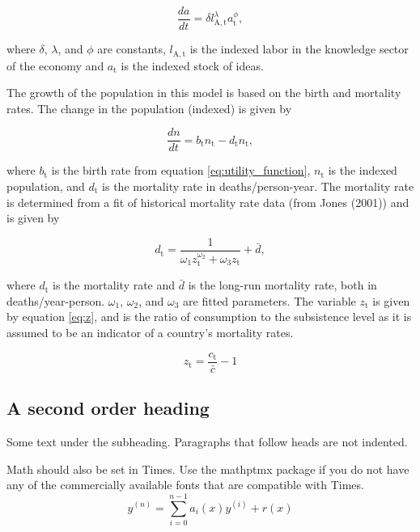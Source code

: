\documentclass[letterpaper,12pt]{article}
\begin{document}
\begin{equation} \label{eq:da_dt}
	\frac{da}{dt} = \delta l_\mathrm{A,t}^\lambda a_\mathrm{t}^\phi,
\end{equation}

\noindent where $\delta$, $\lambda$, and $\phi$ are constants, $l_\mathrm{A,t}$ is the indexed labor in the knowledge sector of the economy and $a_\mathrm{t}$ is the indexed stock of ideas.

The growth of the population in this model is based on the birth and mortality rates. The change in the population (indexed) is given by

\begin{equation} \label{eq:dn_dt}
	\frac{dn}{dt} = b_\mathrm{t} n_\mathrm{t} - d_\mathrm{t} n_\mathrm{t},
\end{equation}

\noindent where $b_\mathrm{t}$ is the birth rate from equation \ref{eq:utility_function}, $n_\mathrm{t}$ is the indexed population, and $d_\mathrm{t}$ is the mortality rate in deaths/person-year. The mortality rate is determined from a fit of historical mortality rate data (from Jones (2001)) and is given by

\begin{equation} \label{eq:mortality_rate}
	d_\mathrm{t} = \frac{1}{\omega_\mathrm{1} z_\mathrm{t}^{\omega_\mathrm{2}} + \omega_\mathrm{3} z_\mathrm{t}} + \bar d,
\end{equation}

\noindent where $d_\mathrm{t}$ is the mortality rate and $\bar d$ is the long-run mortality rate, both in deaths/year-person. $\omega_\mathrm{1}$, $\omega_\mathrm{2}$, and $\omega_\mathrm{3}$ are fitted parameters. The variable $z_\mathrm{t}$ is given by equation \ref{eq:z}, and is the ratio of consumption to the subsistence level as it is assumed to be an indicator of a country's mortality rates.

\begin{equation} \label{eq:z}
	z_\mathrm{t} = \frac{c_\mathrm{t}}{\bar c} - 1
\end{equation}



\subsection{A second order heading}

Some text under the subheading. Paragraphs that follow heads are not
indented.

Math should also be set in Times. Use the mathptmx package if you do not have
any of the commercially available fonts that are compatible with Times.
\begin{equation}
    y^{(n)} = \sum_{i=0}^{n-1} a_i(x) y^{(i)} + r(x) 
\end{equation}
\end{document}
